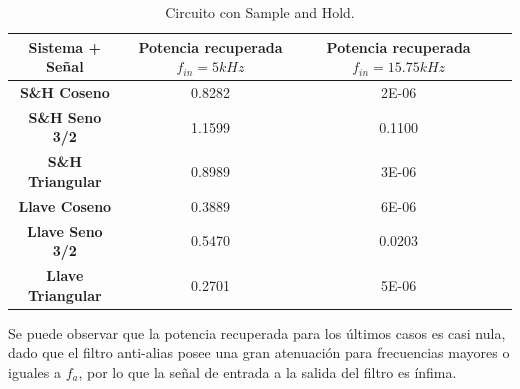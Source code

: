 \begin{table}[H]
\centering
\begin{tabular}{cccc}
\hline
\textbf{Sistema + Señal}  & \textbf{Potencia recuperada $f_{in}=5kHz$} & \textbf{Potencia recuperada $f_{in}=15.75kHz$} \\ \hline
\textbf{S\&H Coseno}     & 0.8282   & 2E-06\\
\textbf{S\&H Seno 3/2}   & 1.1599  & 0.1100\\
\textbf{S\&H Triangular} & 0.8989  & 3E-06\\
\textbf{Llave Coseno}     & 0.3889 & 6E-06 \\
\textbf{Llave Seno 3/2}   & 0.5470  & 0.0203\\
\textbf{Llave Triangular} & 0.2701	& 5E-06\\ \hline
\end{tabular}
\caption{Circuito con Sample and Hold.}
\label{tab:res3}
\end{table}

Se puede observar que la potencia recuperada para los últimos casos es casi nula, dado que el filtro anti-alias posee una gran atenuación para frecuencias mayores o iguales a $f_a$, por lo que la señal de entrada a la salida del filtro es ínfima.

